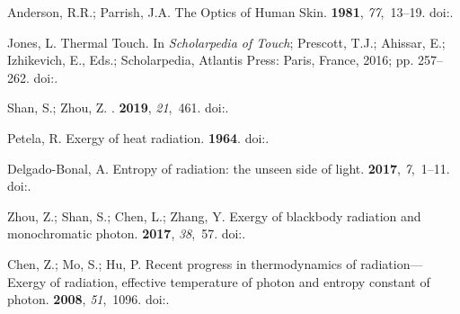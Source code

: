 \documentclass[energies,article,accept,moreauthors,pdftex]{Definitions/mdpi}\usepackage[]{graphicx}\usepackage[]{color}
\begin{document}
\begin{thebibliography}{999}
Anderson, R.R.; Parrish, J.A.
\newblock The Optics of Human Skin.
 {\bf 1981}, {\em
  77},~13--19.
\newblock
  doi:{\href{https://doi.org/10.1111/1523-1747.ep12479191}{}}.%

Jones, L.
\newblock Thermal Touch. In {\em Scholarpedia of Touch}; Prescott, T.J.;
  Ahissar, E.; Izhikevich, E., Eds.; Scholarpedia, Atlantis Press: Paris, France,
  2016; pp. 257--262.
\newblock
  doi:{\href{https://doi.org/10.2991/978-94-6239-133-8}{}}.%

Shan, S.; Zhou, Z.
.
 {\bf 2019}, {\em 21},~461.
\newblock
  doi:{\href{https://doi.org/10.3390/e21050461}{}}.%

Petela, R.
\newblock Exergy of heat radiation.
 {\bf 1964}.
\newblock
  doi:{\href{https://doi.org/10.1115/1.3687092}{}}.%

Delgado-Bonal, A.
\newblock Entropy of radiation: the unseen side of light.
 {\bf 2017}, {\em 7},~1--11.
\newblock
  doi:{\href{https://doi.org/10.1038/s41598-017-01622-6}{}}.%

Zhou, Z.; Shan, S.; Chen, L.; Zhang, Y.
\newblock Exergy of blackbody radiation and monochromatic photon.
 {\bf 2017}, {\em
  38},~57.
\newblock
  doi:{\href{https://doi.org/10.1007/s10765-017-2196-8}{}}.%

Chen, Z.; Mo, S.; Hu, P.
\newblock Recent progress in thermodynamics of radiation---Exergy of radiation,
  effective temperature of photon and entropy constant of photon.
 {\bf 2008},
  {\em 51},~1096.%
\newblock
  doi:{\href{https://doi.org/10.1007/s11431-008-0158-x}{}}.


\end{thebibliography}
\end{document}
